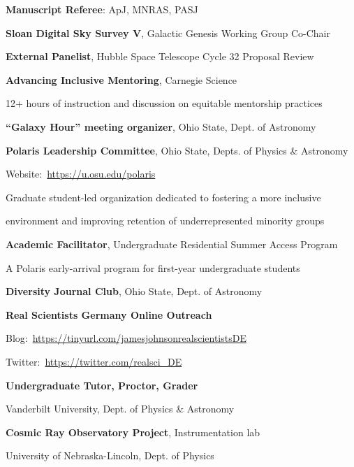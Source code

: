\documentclass[cv.tex]{subfiles}
\begin{document}
\parbox{0.8\textwidth}{%
	\vspace{1mm}
	\textbf{Manuscript Referee}: ApJ, MNRAS, PASJ \par
	\textbf{Sloan Digital Sky Survey V}, Galactic Genesis Working Group Co-Chair
	\par
	\textbf{External Panelist}, Hubble Space Telescope Cycle 32 Proposal Review
	\par
	\textbf{Advancing Inclusive Mentoring}, Carnegie Science \par
	12+ hours of instruction and discussion on equitable mentorship practices \par
	\textbf{``Galaxy Hour'' meeting organizer}, Ohio State, Dept. of Astronomy
	\par
	\textbf{Polaris Leadership Committee}, Ohio State, Depts. of Physics \&
	Astronomy \par
	Website:~\url{https://u.osu.edu/polaris} \par
	Graduate student-led organization dedicated to fostering a more inclusive
	\par
	environment and improving retention of underrepresented minority groups \par
	\textbf{Academic Facilitator}, Undergraduate Residential Summer Access
	Program \par
	A Polaris early-arrival program for first-year undergraduate students \par
	\textbf{Diversity Journal Club}, Ohio State, Dept. of Astronomy \par
	\textbf{Real Scientists Germany Online Outreach} \par
	Blog:~\url{https://tinyurl.com/jamesjohnsonrealscientistsDE} \par
	Twitter:~\url{https://twitter.com/realsci_DE} \par
	\textbf{Undergraduate Tutor, Proctor, Grader} \par
	Vanderbilt University, Dept. of Physics \& Astronomy \par
	\textbf{Cosmic Ray Observatory Project}, Instrumentation lab \par
	University of Nebraska-Lincoln, Dept. of Physics \par
}
\end{document}
